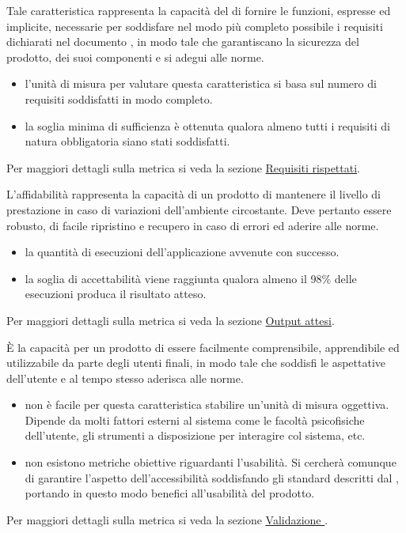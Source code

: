 \documentclass[a4paper, titlepage]{article}
\begin{document}
Tale caratteristica rappresenta la capacità del  di fornire le funzioni, espresse ed implicite, necessarie per soddisfare nel modo più completo possibile i requisiti dichiarati nel documento \ARdoc, in modo tale che garantiscano la sicurezza del prodotto, dei suoi componenti e si adegui alle norme.
\begin{itemize}
\item {} l'unità di misura per valutare questa caratteristica si basa sul numero di requisiti soddisfatti in modo completo.
\item {} la soglia minima di sufficienza è ottenuta qualora almeno tutti i requisiti di natura obbligatoria siano stati soddisfatti.
\end{itemize}
Per maggiori dettagli sulla metrica si veda la sezione \hyperref[par:req]{Requisiti rispettati}.

\newpage
{}
L'affidabilità rappresenta la capacità di un prodotto  di mantenere il livello di prestazione in caso di variazioni dell'ambiente circostante. Deve pertanto essere robusto, di facile ripristino e recupero in caso di errori ed aderire alle norme.
\begin{itemize}
\item {} la quantità di esecuzioni dell'applicazione avvenute con successo.
\item {} la soglia di accettabilità viene raggiunta qualora almeno il 98\% delle esecuzioni produca il risultato atteso.
\end{itemize}
Per maggiori dettagli sulla metrica si veda la sezione \hyperref[par:out]{Output attesi}.

È la capacità per un prodotto di essere facilmente comprensibile, apprendibile ed utilizzabile da parte degli utenti finali, in modo tale che soddisfi le aspettative dell'utente e al tempo stesso aderisca alle norme. 
\begin{itemize}
\item {} non è facile per questa caratteristica stabilire un'unità di misura oggettiva. Dipende da molti fattori esterni al sistema come le facoltà psicofisiche dell'utente, gli strumenti a disposizione per interagire col sistema, etc.
\item {} non esistono metriche obiettive riguardanti l’usabilità. Si cercherà comunque di garantire l'aspetto dell'accessibilità soddisfando gli standard  descritti dal , portando in questo modo benefici all'usabilità del prodotto.
\end{itemize}
Per maggiori dettagli sulla metrica si veda la sezione \hyperref[par:web]{Validazione }.
\end{document}
